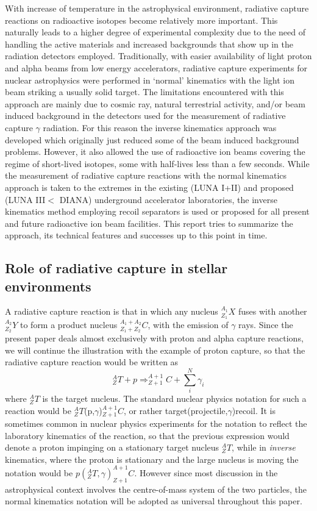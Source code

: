 With increase of temperature in the astrophysical environment, radiative capture reactions on radioactive isotopes become relatively more important. This naturally leads to a higher degree of experimental complexity due to the need of handling the active materials and increased backgrounds that show up in the radiation detectors employed. Traditionally, with easier availability of light proton and alpha beams from low energy accelerators, radiative capture experiments for nuclear astrophysics were performed in `normal' kinematics with the light ion beam striking a usually solid target. The limitations encountered with this approach are mainly due to cosmic ray, natural terrestrial activity, and/or beam induced background in the detectors used for the measurement of radiative capture $\gamma$ radiation. For this reason the inverse kinematics approach was developed which originally just reduced some of the beam induced background problems. However, it also allowed the use of radioactive ion beams covering the regime of short-lived isotopes, some with half-lives less than a few seconds. While the measurement of radiative capture reactions with the normal kinematics approach is taken to the extremes in the existing (LUNA I+II) and proposed (LUNA III$<$ DIANA) underground accelerator laboratories, the inverse kinematics method employing recoil separators is used or proposed for all present and future radioactive ion beam facilities. This report tries to summarize the approach, its technical features and successes up to this point in time.


\subsection{Role of radiative capture in stellar environments}

A radiative capture reaction is that in which any nucleus $^{A_{1}}_{Z_{1}}X$ fuses with another $^{A_{2}}_{Z_{2}}Y$ to form a product nucleus $^{A_{1}+A_{2}}_{Z_{1}+Z_{2}}C$, with the emission of $\gamma$ rays. Since the present paper deals almost exclusively with proton and alpha capture reactions, we will continue the illustration with the example of proton capture, so that the radiative capture reaction would be written as
\begin{equation}
^{A}_{Z}T+p\Rightarrow^{A+1}_{Z+1}C+\sum_{i}^{N}{\gamma_{i}}
\end{equation}
where $^{A}_{Z}T$ is the target nucleus. The standard nuclear physics notation for such a reaction would be $^{A}_{Z}T$(p,$\gamma$)$^{A+1}_{Z+1}C$, or rather target(projectile,$\gamma$)recoil. It is sometimes common in nuclear physics experiments for the notation to reflect the laboratory kinematics of the reaction, so that the previous expression would denote a proton impinging on a stationary target nucleus $^{A}_{Z}T$, while in {\it inverse} kinematics, where the proton is stationary and the large nucleus is moving the notation would be $p(^{A}_{Z}T,\gamma)^{A+1}_{Z+1}C$. However since most discussion in the astrophysical context involves the centre-of-mass system of the two particles, the normal kinematics notation will be adopted as universal throughout this paper. 

